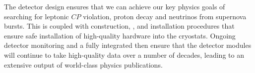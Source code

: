 The detector design ensures that we can achieve our key physics goals of searching for leptonic $CP$ violation, proton decay and neutrinos from supernova bursts. This is coupled with construction, ,  and installation procedures that ensure safe installation of high-quality hardware into the cryostats. Ongoing detector monitoring and a fully integrated  then ensure that the detector modules will continue to take high-quality data over a number of decades, leading to an extensive output of world-class physics publications.

